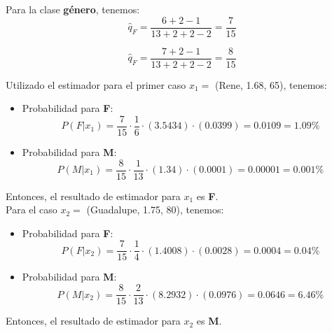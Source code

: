 \documentclass[letterpaper,12pt]{article}
\theoremstyle{definition}
\begin{document}
Para la clase \textbf{género}, tenemos:\\

\begin{equation}
  \hat{q}_F = \frac{6+2-1}{13+2+2-2} = \frac{7}{15}
\end{equation}

\begin{equation}
  \hat{q}_F = \frac{7+2-1}{13+2+2-2} = \frac{8}{15}
\end{equation}

\medskip


Utilizado el estimador para el primer caso \(x_1 = \) (Rene, 1.68, 65), tenemos:\\
\begin{itemize}
  \item Probabilidad para \textbf{F}:
  \begin{equation}
    P(F|x_1) = \frac{7}{15}  \cdot \frac{1}{6} \cdot (3.5434) \cdot (0.0399) = 0.0109 = 1.09\%
  \end{equation}
  \item Probabilidad para \textbf{M}:
  \begin{equation}
    P(M|x_1) = \frac{8}{15}  \cdot \frac{1}{13} \cdot (1.34) \cdot (0.0001) = 0.00001 = 0.001\%
  \end{equation}
\end{itemize}
\medskip

Entonces, el resultado de estimador para \(x_1\) es \textbf{F}.\\

Para el caso \(x_2 = \) (Guadalupe, 1.75, 80), tenemos:\\
\begin{itemize}
  \item Probabilidad para \textbf{F}:
  \begin{equation}
    P(F|x_2) = \frac{7}{15}  \cdot \frac{1}{4} \cdot (1.4008) \cdot (0.0028) = 0.0004 = 0.04\%
  \end{equation}
  \item Probabilidad para \textbf{M}: 
  \begin{equation}
    P(M|x_2) = \frac{8}{15}  \cdot \frac{2}{13} \cdot (8.2932) \cdot (0.0976) = 0.0646 = 6.46\%
  \end{equation}
\end{itemize}
\medskip

Entonces, el resultado de estimador para \(x_2\) es \textbf{M}.\\
\end{document}
